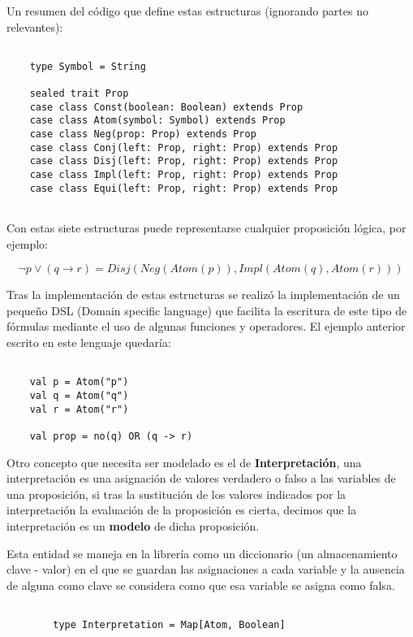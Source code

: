 	Un resumen del código que define estas estructuras (ignorando partes no relevantes):
	
	\begin{lstlisting}[style=myScalastyle]

	type Symbol = String
	
	sealed trait Prop 
	case class Const(boolean: Boolean) extends Prop
	case class Atom(symbol: Symbol) extends Prop
	case class Neg(prop: Prop) extends Prop
	case class Conj(left: Prop, right: Prop) extends Prop
	case class Disj(left: Prop, right: Prop) extends Prop
	case class Impl(left: Prop, right: Prop) extends Prop
	case class Equi(left: Prop, right: Prop) extends Prop
		
	\end{lstlisting}

	Con estas siete estructuras puede representarse cualquier proposición lógica, por ejemplo:
	
	\[
		\neg p \vee (q \rightarrow r) = Disj(Neg(Atom(p)), Impl(Atom(q), Atom(r)))
	\]
	
	Tras la implementación de estas estructuras se realizó la implementación de un pequeño DSL (Domain specific language) que facilita la escritura de este tipo de fórmulas mediante el uso de algunas funciones y operadores. El ejemplo anterior escrito en este lenguaje quedaría: 
	
		
	\begin{lstlisting}[style=myScalastyle]
	
	val p = Atom("p")
	val q = Atom("q")
	val r = Atom("r")
	
	val prop = no(q) OR (q -> r)
	\end{lstlisting}
	
	Otro concepto que necesita ser modelado es el de \textbf{Interpretación}, una interpretación es una asignación de valores verdadero o falso a las variables de una proposición, si tras la sustitución de los valores indicados por la interpretación la evaluación de la proposición es cierta, decimos que la interpretación es un \textbf{modelo} de dicha proposición.
	
	Esta entidad se maneja en la librería como un diccionario (un almacenamiento clave - valor) en el que se guardan las asignaciones a cada variable y la ausencia de alguna como clave se considera como que esa variable se asigna como falsa.
	
	\begin{lstlisting}[style=myScalastyle]
		
		type Interpretation = Map[Atom, Boolean]
	
	\end{lstlisting}
	
